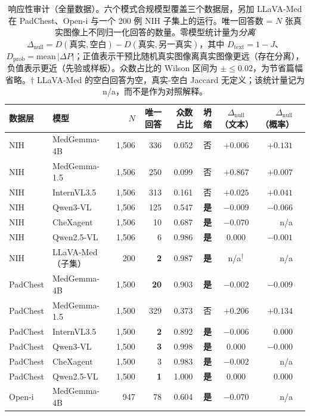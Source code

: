 \begin{table}[t]
\centering
\footnotesize
\caption{响应性审计（全量数据）。六个模式合规模型覆盖三个数据层，另加 LLaVA-Med 在 PadChest、Open-i 与一个 200 例 NIH 子集上的运行。唯一回答数 = $N$ 张真实图像上不同归一化回答的数量。零模型统计量为\emph{分离} $\Delta_{\text{null}} = D(\text{真实},\text{空白}) - D(\text{真实},\text{另一真实})$，其中 $D_{\text{text}} = 1-J$、$D_{\text{prob}} = \text{mean}\,|\Delta P|$；正值表示干预比随机真实图像离真实图像更远（存在分离），负值表示更近（先验或样板）。众数占比的 Wilson 区间为 $\pm\le 0.02$，为节省篇幅省略。$\dagger$ LLaVA-Med 的空白回答为空，真实-空白 Jaccard 无定义；该统计量记为 n/a，而不是作为对照解释。}
\label{tab:audit}
\begin{tabular}{llrrrrcrr}
\toprule
数据层 & 模型 & $N$ & 唯一回答 & 众数占比 & 坍缩 & $\Delta_{\text{null}}$（文本） & $\Delta_{\text{null}}$（概率） \\
\midrule
NIH & MedGemma-4B & 1,506 & 336 & 0.052 & 否 & $+0.006$ & $+0.131$ \\
NIH & MedGemma-1.5 & 1,506 & 250 & 0.099 & 否 & $+0.867$ & $+0.007$ \\
NIH & InternVL3.5 & 1,506 & 313 & 0.161 & 否 & $+0.025$ & $+0.041$ \\
NIH & Qwen3-VL & 1,506 & 125 & 0.547 & \textbf{是} & $-0.009$ & $-0.066$ \\
NIH & CheXagent & 1,506 & 10 & 0.687 & \textbf{是} & $-0.070$ & n/a \\
NIH & Qwen2.5-VL & 1,506 & 6 & 0.986 & \textbf{是} & $0.000$ & $-0.001$ \\
NIH & LLaVA-Med（子集） & 200 & \textbf{2} & 0.987 & \textbf{是} & n/a$^{\dagger}$ & n/a \\
\midrule
PadChest & MedGemma-4B & 1,500 & \textbf{20} & 0.903 & \textbf{是} & $-0.002$ & $-0.009$ \\
PadChest & MedGemma-1.5 & 1,500 & 329 & 0.373 & 否 & $+0.206$ & $+0.134$ \\
PadChest & InternVL3.5 & 1,500 & \textbf{2} & 0.892 & \textbf{是} & $-0.006$ & $0.000$ \\
PadChest & Qwen3-VL & 1,500 & \textbf{3} & 0.998 & \textbf{是} & $0.000$ & $-0.000$ \\
PadChest & CheXagent & 1,500 & 3 & 0.983 & \textbf{是} & $-0.002$ & n/a \\
PadChest & Qwen2.5-VL & 1,500 & \textbf{1} & 1.000 & \textbf{是} & $0.000$ & $0.000$ \\
\midrule
Open-i & MedGemma-4B & 947 & 78 & 0.604 & \textbf{是} & $-0.070$ & n/a \\

\end{tabular}
\end{table}
